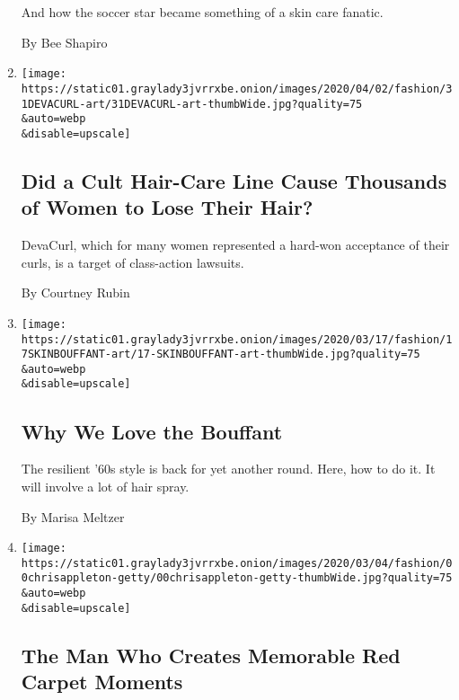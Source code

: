 \begin{enumerate}
  And how the soccer star became something of a skin care fanatic.

  By Bee Shapiro
\item
  \href{/2020/04/01/style/deva-curl-hair-loss.html}{}

  \texttt{[image: https://static01.graylady3jvrrxbe.onion/images/2020/04/02/fashion/31DEVACURL-art/31DEVACURL-art-thumbWide.jpg?quality=75\\\&auto=webp\\\&disable=upscale]}

  \hypertarget{did-a-cult-hair-care-line-cause-thousands-of-women-to-lose-their-hair}{%
  \subsection{Did a Cult Hair-Care Line Cause Thousands of Women to Lose
  Their
  Hair?}\label{did-a-cult-hair-care-line-cause-thousands-of-women-to-lose-their-hair}}

  DevaCurl, which for many women represented a hard-won acceptance of
  their curls, is a target of class-action lawsuits.

  By Courtney Rubin
\item
  \href{/2020/03/17/style/why-we-love-the-bouffant.html}{}

  \texttt{[image: https://static01.graylady3jvrrxbe.onion/images/2020/03/17/fashion/17SKINBOUFFANT-art/17-SKINBOUFFANT-art-thumbWide.jpg?quality=75\\\&auto=webp\\\&disable=upscale]}

  \hypertarget{why-we-love-the-bouffant}{%
  \subsection{Why We Love the Bouffant}\label{why-we-love-the-bouffant}}

  The resilient '60s style is back for yet another round. Here, how to
  do it. It will involve a lot of hair spray.

  By Marisa Meltzer
\item
  \href{/2020/02/22/style/chris-appleton-hair-jennifer-lopez-the-man-who-creates-memorable-red-carpet-moments-.html}{}

  \texttt{[image: https://static01.graylady3jvrrxbe.onion/images/2020/03/04/fashion/00chrisappleton-getty/00chrisappleton-getty-thumbWide.jpg?quality=75\\\&auto=webp\\\&disable=upscale]}

  \hypertarget{the-man-who-creates-memorable-red-carpet-moments}{%
  \subsection{The Man Who Creates Memorable Red Carpet
  Moments}\label{the-man-who-creates-memorable-red-carpet-moments}}


\end{enumerate}
